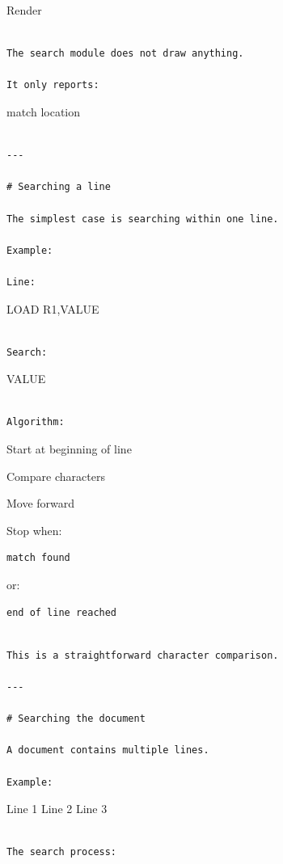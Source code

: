 \documentclass[
  oneside,
  openany]{book}
\begin{document}
Render

\begin{verbatim}

The search module does not draw anything.

It only reports:
\end{verbatim}

match location

\begin{verbatim}

---

# Searching a line

The simplest case is searching within one line.

Example:

Line:
\end{verbatim}

LOAD R1,VALUE

\begin{verbatim}

Search:
\end{verbatim}

VALUE

\begin{verbatim}

Algorithm:
\end{verbatim}

Start at beginning of line

Compare characters

Move forward

Stop when:

\begin{verbatim}
match found
\end{verbatim}

or:

\begin{verbatim}
end of line reached
\end{verbatim}

\begin{verbatim}

This is a straightforward character comparison.

---

# Searching the document

A document contains multiple lines.

Example:
\end{verbatim}

Line 1 Line 2 Line 3

\begin{verbatim}

The search process:
\end{verbatim}
\end{document}

